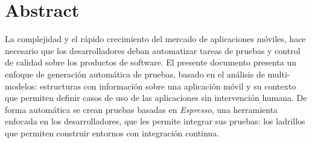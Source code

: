 %
\chapter*{Abstract}
\label{sec:abstract}
\vspace*{-10mm}
La complejidad y el rápido crecimiento del mercado de aplicaciones móviles, hace necesario que los desarrolladores deban automatizar tareas de pruebas y control de calidad sobre los productos de software. El presente documento presenta un enfoque de generación automática de pruebas, basado en el análisis de multi-modelos: estructuras con información sobre una aplicación móvil y su contexto que permiten definir casos de uso de las aplicaciones sin intervención humana. De forma automática se crean pruebas basadas en \textit{Espresso}, una herramienta enfocada en los desarrolladores, que les permite integrar sus pruebas: los ladrillos que permiten construir entornos con integración continua.

\vspace*{20mm}
